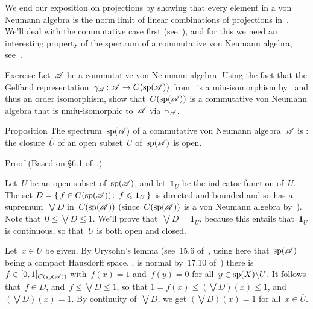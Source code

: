 \documentclass[a]{subfiles}
\begin{document}
\begin{parsec}%
\begin{point}%
We end our exposition on projections
by showing that every element in a von Neumann 
algebra is the norm limit of linear combinations
of projections in~.
We'll deal with the  commutative case first
(see~),
and for this we
need an interesting 
property of the spectrum of a commutative von Neumann algebra,
see~.
\end{point}
\begin{point}[ngelfand]{Exercise}%
Let~$\mathscr{A}$ be a commutative von Neumann algebra.
Using the fact that
the Gelfand representation~$\gamma_{\mathscr{A}}\colon \mathscr{A}\to C(\mathrm{sp}(\mathscr{A}))$
from~
is a miu-isomorphism 
by~
and thus an order isomorphism,
show that~$C(\mathrm{sp}(\mathscr{A}))$
is a commutative von Neumann algebra
that is nmiu-isomorphic
to~$\mathscr{A}$ via~$\gamma_{\mathscr{A}}$.
\end{point}
\begin{point}{Proposition}%
The spectrum~$\mathrm{sp}(\mathscr{A})$
of a commutative von Neumann algebra~$\mathscr{A}$
is :
the closure~$\overline{U}$
of an open subset~$U$ of~$\mathrm{sp}(\mathscr{A})$
is open.
\begin{point}{Proof}%
(Based on \S6.1 of~\cite{riesz}.)

Let~$U$ be an open subset of~$\mathrm{sp}(\mathscr{A})$,
and let~$\mathbf{1}_U$ be the indicator function
of~$U$.
The set $D=\{\,f\in C(\mathrm{sp}(\mathscr{A}))\colon\, f\leqslant \mathbf{1}_U\,\}$
is directed and bounded 
and so has a supremum~$\bigvee D$
in~$C(\mathrm{sp}(\mathscr{A}))$
(since~$C(\mathrm{sp}(\mathscr{A}))$ is a von Neumann algebra by~).
Note that~$0\leq \bigvee D\leq 1$.
We'll prove that~$\bigvee D = \mathbf{1}_{\overline{U}}$,
because this entails
that~$\mathbf{1}_{\overline{U}}$
is continuous,  so that~$\overline{U}$ is both open and closed.

Let~$x\in U$ be given.
By Urysohn's lemma (see~15.6 of~\cite{willard},
using here that~$\mathrm{sp}(\mathscr{A})$ being a compact Hausdorff
space, , 
is normal by~17.10 of~\cite{willard})
there is $f\in [0,1]_{C(\mathrm{sp}(\mathscr{A}))}$
with~$f(x)=1$ and~$f(y)=0$ for all~$y\in \mathrm{sp}(X)\backslash U$.
It follows that~$f\in D$,
and~$f\leq \bigvee D\leq 1$,
so that $1=f(x)\leq (\bigvee D)(x)\leq 1$,
and~$(\bigvee D)(x)=1$.
By continuity of~$\bigvee D$,
we get $(\bigvee D)(x)=1$ for all~$x\in \overline{U}$.


\end{point}
\end{point}
\end{parsec}
\end{document}
